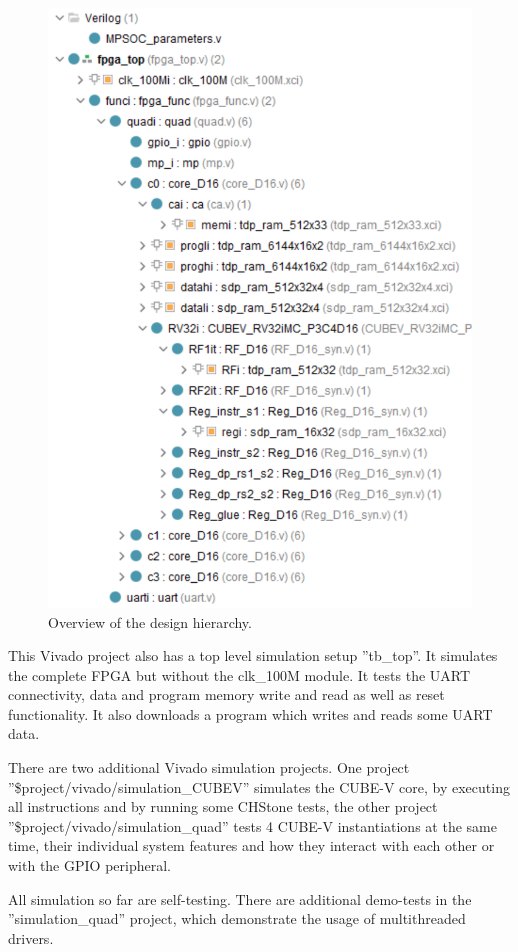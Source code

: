 \begin{figure}[!t]
	\centering
	\includegraphics[width=6in]{figs/hierarchy}
	\caption{Overview of the design hierarchy.}
	\label{hierarchy}
\end{figure}


This Vivado project also has a top level simulation setup ''tb\_top''. It simulates the complete FPGA but without the clk\_100M module. It tests the UART connectivity, data and program memory write and read as well as reset functionality. It also downloads a program which writes and reads some UART data.

There are two additional Vivado simulation projects. One project ''\$project/vivado/simulation\_CUBEV'' simulates the CUBE-V core, by executing all instructions and by running some CHStone tests, the other project ''\$project/vivado/simulation\_quad'' tests 4 CUBE-V instantiations at the same time, their individual system features and how they interact with each other or with the GPIO peripheral. 

All simulation so far are self-testing. There are additional demo-tests in the ''simulation\_quad'' project, which  demonstrate the usage of multithreaded drivers.
